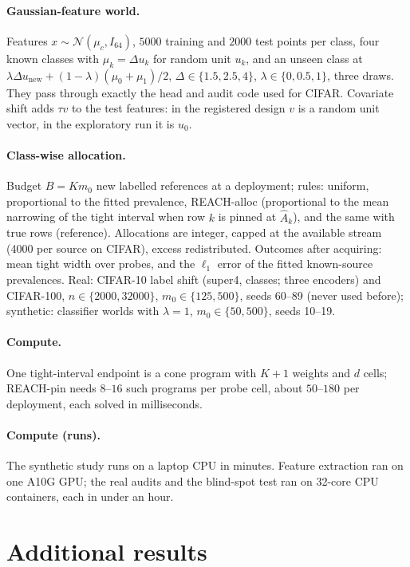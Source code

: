 \paragraph{Gaussian-feature world.} Features $x\sim\mathcal N(\mu_c,I_{64})$, $5000$ training and $2000$
test points per class, four known classes with $\mu_k=\Delta u_k$ for random unit $u_k$, and an unseen
class at $\lambda\Delta u_{\text{new}}+(1-\lambda)(\mu_0+\mu_1)/2$, $\Delta\in\{1.5,2.5,4\}$,
$\lambda\in\{0,0.5,1\}$, three draws. They pass through exactly the head and audit code used for CIFAR.
Covariate shift adds $\tau v$ to the test features: in the registered design $v$ is a random unit vector,
in the exploratory run it is $u_0$.

\paragraph{Class-wise allocation.} Budget $B=K m_0$ new labelled references at a deployment; rules:
uniform, proportional to the fitted prevalence, REACH-alloc (proportional to the mean narrowing of the tight
interval when row $k$ is pinned at $\hat A_k$), and the same with true rows (reference). Allocations are
integer, capped at the available stream (4000 per source on CIFAR), excess redistributed. Outcomes after
acquiring: mean tight width over probes, and the $\ell_1$ error of the fitted known-source prevalences.
Real: CIFAR-10 label shift (super4, classes; three encoders) and CIFAR-100, $n\in\{2000,32000\}$,
$m_0\in\{125,500\}$, seeds 60--89 (never used before); synthetic: classifier worlds with $\lambda=1$,
$m_0\in\{50,500\}$, seeds 10--19.

\paragraph{Compute.} One tight-interval endpoint is a cone program with $K+1$ weights and $d$ cells; REACH-pin
needs $8$--$16$ such programs per probe cell, about $50$--$180$ per deployment, each solved in milliseconds.
\paragraph{Compute (runs).} The synthetic study runs on a laptop CPU in minutes. Feature extraction ran on one
A10G GPU; the real audits and the blind-spot test ran on 32-core CPU containers, each in under an
hour.

\section{Additional results}
\label{app:extra}

